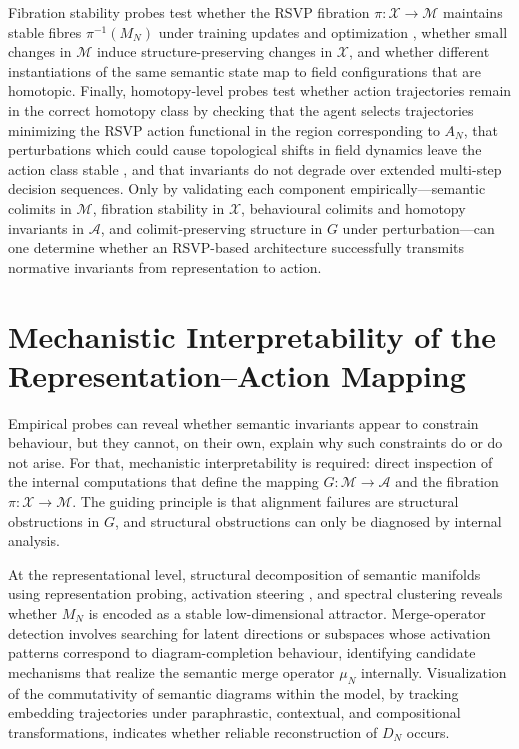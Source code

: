 \documentclass[12pt]{article}
\theoremstyle{definition}
\begin{document}
Fibration stability probes test whether the RSVP fibration $\pi : \mathcal{X}
\to \mathcal{M}$ maintains stable fibres $\pi^{-1}(M_N)$ under training updates
and optimization \citep{elhage2022}, whether small changes in $\mathcal{M}$
induce structure-preserving changes in $\mathcal{X}$, and whether different
instantiations of the same semantic state map to field configurations that are
homotopic. Finally, homotopy-level probes test whether action trajectories
remain in the correct homotopy class by checking that the agent selects
trajectories minimizing the RSVP action functional in the region corresponding
to $A_N$, that perturbations which could cause topological shifts in field
dynamics leave the action class stable \citep{strogatz2018}, and that invariants
do not degrade over extended multi-step decision sequences. Only by validating
each component empirically---semantic colimits in $\mathcal{M}$, fibration
stability in $\mathcal{X}$, behavioural colimits and homotopy invariants in
$\mathcal{A}$, and colimit-preserving structure in $G$ under perturbation---can
one determine whether an RSVP-based architecture successfully transmits
normative invariants from representation to action.

\section{Mechanistic Interpretability of the Representation--Action Mapping}

Empirical probes can reveal whether semantic invariants appear to constrain
behaviour, but they cannot, on their own, explain why such constraints do or do
not arise. For that, mechanistic interpretability is required: direct inspection
of the internal computations that define the mapping $G : \mathcal{M} \to
\mathcal{A}$ and the fibration $\pi : \mathcal{X} \to \mathcal{M}$. The guiding
principle is that alignment failures are structural obstructions in $G$, and
structural obstructions can only be diagnosed by internal analysis.

At the representational level, structural decomposition of semantic manifolds
using representation probing, activation steering \citep{burns2022}, and
spectral clustering reveals whether $M_N$ is encoded as a stable low-dimensional
attractor. Merge-operator detection involves searching for latent directions or
subspaces whose activation patterns correspond to diagram-completion behaviour,
identifying candidate mechanisms that realize the semantic merge operator
$\mu_N$ internally. Visualization of the commutativity of semantic diagrams
within the model, by tracking embedding trajectories under paraphrastic,
contextual, and compositional transformations, indicates whether reliable
reconstruction of $D_N$ occurs.
\end{document}
